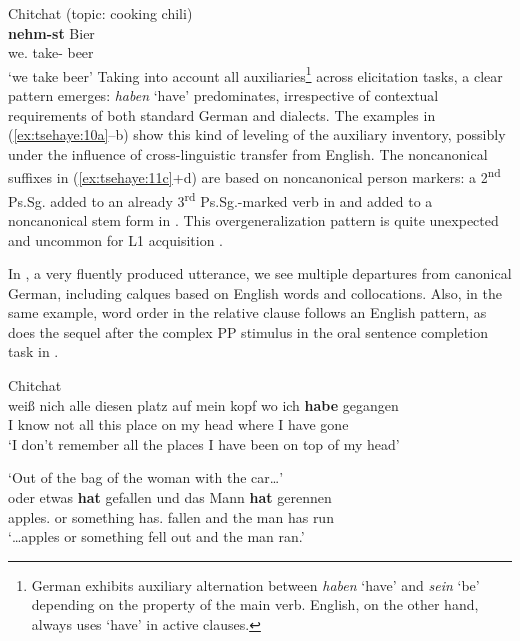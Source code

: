 \documentclass[output=paper]{langscibook}
\begin{document}
\ex Chitchat (topic: cooking chili)\label{ex:tsehaye:11d}\\
 \textbf{{nehm-st}} {Bier}\\
we.\Fpl{} take-\Ssg{} beer\\
\glt ‘we take beer’
\z
\z
{}
Taking into account all auxiliaries\footnote{German exhibits auxiliary alternation between \textit{haben} ‘have’ and \textit{sein} ‘be’ depending on the property of the main verb. English, on the other hand, always uses ‘have’ in active clauses.} across elicitation tasks, a clear pattern emerges: \textit{haben} ‘have’ predominates, irrespective of contextual requirements of both standard German and dialects. The examples in (\ref{ex:tsehaye:10a}--b) show this kind of leveling of the auxiliary inventory, possibly under the influence of cross-lin\-guis\-tic transfer from English. The noncanonical suffixes in (\ref{ex:tsehaye:11c}+d) are based on noncanonical person markers: a 2\textsuperscript{nd} Ps.Sg. added to an already 3\textsuperscript{rd} Ps.Sg.-marked verb in  and added to a noncanonical stem form in . This overgeneralization pattern is quite unexpected and uncommon for L1 acquisition \parencites[26]{Aalberse2009}[193]{AalberseStoop2015}.

In , a very fluently produced utterance, we see multiple departures from canonical German, including calques based on English words and collocations. Also, in the same example, word order in the relative clause follows an English pattern, as does the sequel after the complex PP stimulus in the oral sentence completion task in .

\ea%
    \label{ex:tsehaye:12}
\ea Chitchat\label{ex:tsehaye:12a}\\
 {weiß} {nich} {alle} {diesen} {platz} {auf} {mein} {kopf} {wo} {ich} \textbf{habe} {gegangen}\\
I know not all this place on my head where I have gone\\
\glt  ‘I don’t remember all the places I have been on top of my head’

 ‘Out of the bag of the woman with the car…’\label{ex:tsehaye:12b}\\
 {oder} {etwas} \textbf{{hat}} {gefallen} {und} {das} {Mann} \textbf{{hat}} {gerennen}\\
apples.\Pl{} or something {has}.\Sg{} fallen and the man {has} run\\
\glt ‘…apples or something fell out and the man ran.’
\z
\z
\end{document}
